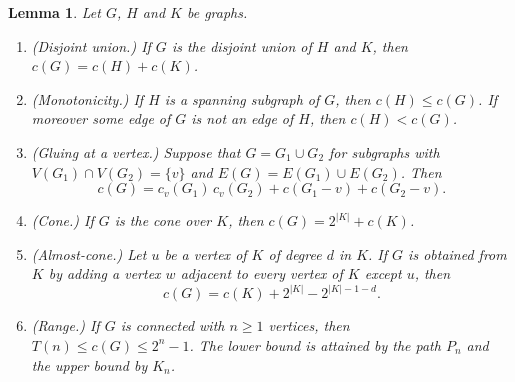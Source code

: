 \documentclass[11pt]{amsart}
\newtheorem{lemma}[theorem]{Lemma}
\theoremstyle{definition}
\theoremstyle{remark}
\newcommand{\Tr}[1]{T(#1)}
\begin{document}
\begin{lemma}\label{lem:rules}
Let $G$, $H$ and $K$ be graphs.
\begin{enumerate}[label=\textup{(\alph*)}]
\item \textup{(Disjoint union.)} If $G$ is the disjoint union of $H$ and $K$, then $c(G)=c(H)+c(K)$.
\item \textup{(Monotonicity.)} If $H$ is a spanning subgraph of $G$, then $c(H)\le c(G)$. If moreover some edge of $G$ is not an edge of $H$, then $c(H)<c(G)$.
\item \textup{(Gluing at a vertex.)} Suppose that $G=G_1\cup G_2$ for subgraphs with $V(G_1)\cap V(G_2)=\{v\}$ and $E(G)=E(G_1)\cup E(G_2)$. Then
\[
c(G)=c_v(G_1)\,c_v(G_2)+c(G_1-v)+c(G_2-v).
\]
\item \textup{(Cone.)} If $G$ is the cone over $K$, then $c(G)=2^{|K|}+c(K)$.
\item \textup{(Almost-cone.)} Let $u$ be a vertex of $K$ of degree $d$ in $K$. If $G$ is obtained from $K$ by adding a vertex $w$ adjacent to every vertex of $K$ except $u$, then
\[
c(G)=c(K)+2^{|K|}-2^{|K|-1-d}.
\]
\item \textup{(Range.)} If $G$ is connected with $n\ge1$ vertices, then $\Tr{n}\le c(G)\le 2^n-1$. The lower bound is attained by the path $P_n$ and the upper bound by $K_n$.
\end{enumerate}
\end{lemma}
\end{document}
